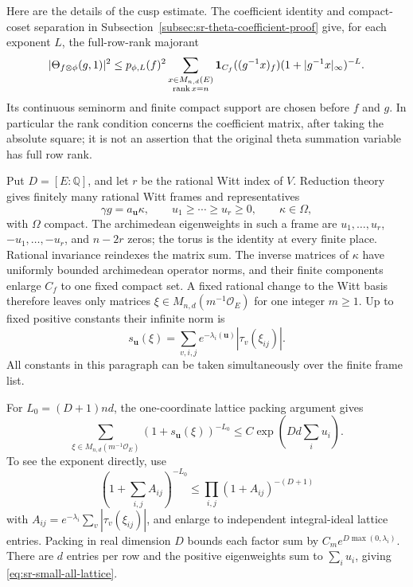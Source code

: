 Here are the details of the cusp estimate. The coefficient
identity and compact-coset separation in
Subsection~\ref{subsec:sr-theta-coefficient-proof} give, for
each exponent \(L\), the full-row-rank majorant
\[
 |\Theta_{f\otimes\phi}(g,1)|^2
 \le p_{\phi,L}(f)^2
       \sum_{\substack{x\in M_{n,d}(E)\\ \operatorname{rank}x=n}}
       {\bf1}_{C_f}((g^{-1}x)_f)
                 (1+|g^{-1}x|_\infty)^{-L}.
\]
Its continuous seminorm and finite compact support are
chosen before \(f\) and \(g\). In particular the rank
condition concerns the coefficient matrix, after taking
the absolute square; it is not an assertion that the
original theta summation variable has full row rank.

Put \(D=[E:\mathbb Q]\), and let \(r\) be the rational
Witt index of \(V\). Reduction theory gives finitely
many rational Witt frames and representatives
\[
       \gamma g=a_{\mathbf u}\kappa,\qquad
       u_1\ge\cdots\ge u_r\ge0,\qquad \kappa\in\Omega ,
\]
with \(\Omega\) compact. The archimedean eigenweights
in such a frame are \(u_1,\ldots,u_r\),
\(-u_1,\ldots,-u_r\), and \(n-2r\) zeros;
the torus is the identity at every finite place.
Rational invariance reindexes the matrix sum.
The inverse matrices of \(\kappa\) have uniformly
bounded archimedean operator norms, and their finite
components enlarge \(C_f\) to one fixed compact set.
A fixed rational change to the Witt basis therefore
leaves only matrices
\(\xi\in M_{n,d}(m^{-1}\mathcal O_E)\)
for one integer \(m\ge1\). Up to fixed positive
constants their infinite norm is
\[
 s_{\mathbf u}(\xi)=
       \sum_{v,i,j}e^{-\lambda_i(\mathbf u)}
                                    |\tau_v(\xi_{ij})|.
\]
All constants in this paragraph can be taken
simultaneously over the finite frame list.

For \(L_0=(D+1)nd\), the one-coordinate lattice packing
argument gives
\begin{equation}\label{eq:sr-small-all-lattice}
 \sum_{\xi\in M_{n,d}(m^{-1}\mathcal O_E)}
                   (1+s_{\mathbf u}(\xi))^{-L_0}
                    \le C\exp\!\left(Dd\sum_i u_i\right).
\end{equation}
To see the exponent directly, use
\[
 (1+\sum_{i,j}A_{ij})^{-L_0}
            \le\prod_{i,j}(1+A_{ij})^{-(D+1)}
\]
with \(A_{ij}=e^{-\lambda_i}\sum_v|\tau_v(\xi_{ij})|\),
and enlarge to independent integral-ideal lattice entries.
Packing in real dimension \(D\) bounds each factor sum
by \(C_m e^{D\max(0,\lambda_i)}\).
There are \(d\) entries per row and the positive
eigenweights sum to \(\sum_i u_i\), giving
\eqref{eq:sr-small-all-lattice}.

